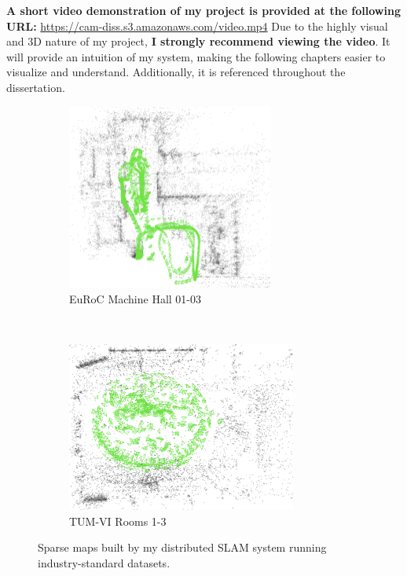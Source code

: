 \begin{leftbar}
    \textbf{A short video demonstration of my project is provided at the following URL:} \url{https://cam-diss.s3.amazonaws.com/video.mp4}  \captionbreak Due to the highly visual and 3D nature of my project, \textbf{I strongly recommend viewing the video}. It will provide an intuition of my system, making the following chapters easier to visualize and understand. Additionally, it is referenced throughout the dissertation.
\end{leftbar}

\begin{figure}[h]
    \centering
    \captionsetup{format=plain}
    \begin{subfigure}[t]{0.475\linewidth}
        \centering
        \includegraphics[height=2.4in]{figures/euroc_mh_map.png}
        \caption{EuRoC Machine Hall 01-03}
    \end{subfigure}\hfill%
    ~
    \begin{subfigure}[t]{0.475\linewidth}
        \centering
        \includegraphics[height=2.2in]{figures/tum_room_map.png}
        \caption{TUM-VI Rooms 1-3}
    \end{subfigure}

    \caption{Sparse maps built by my distributed SLAM system running industry-standard datasets.}
    \label{fig:example-maps}
\end{figure}
